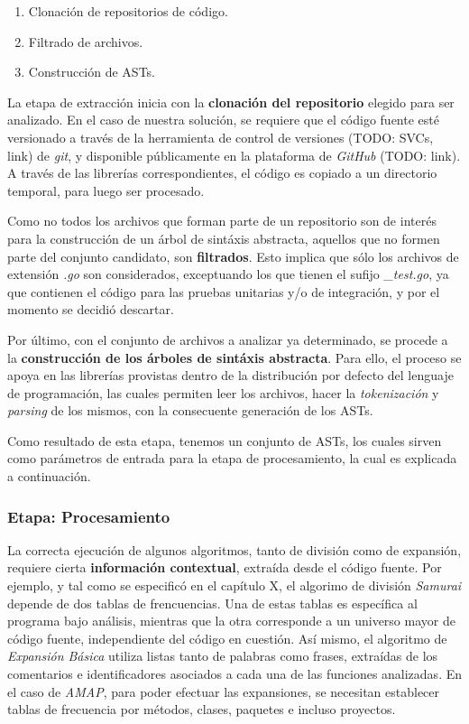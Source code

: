 \begin{enumerate}
  \item Clonación de repositorios de código.
  \item Filtrado de archivos.
  \item Construcción de ASTs.
\end{enumerate}

La etapa de extracción inicia con la \textbf{clonación del repositorio} elegido para ser
analizado. En el caso de nuestra solución, se requiere que el código fuente esté
versionado a través de la herramienta de control de versiones (TODO: SVCs, link) de \textit{git},
y disponible públicamente en la plataforma de \textit{GitHub} (TODO: link).
A través de las librerías correspondientes, el código es copiado a un directorio temporal,
para luego ser procesado.

Como no todos los archivos que forman parte de un repositorio son de interés para la construcción
de un árbol de sintáxis abstracta, aquellos que no formen parte del conjunto candidato, son
\textbf{filtrados}.
Esto implica que sólo los archivos de extensión \textit{.go} son considerados, exceptuando
los que tienen el sufijo \textit{\_test.go}, ya que contienen el código para las pruebas
unitarias y/o de integración, y por el momento se decidió descartar.

Por último, con el conjunto de archivos a analizar ya determinado, se procede a la
\textbf{construcción de los árboles de sintáxis abstracta}.
Para ello, el proceso se apoya en las librerías provistas dentro de la distribución
por defecto del lenguaje de programación, las cuales permiten leer los archivos,
hacer la \textit{tokenización} y \textit{parsing} de los mismos, con la consecuente
generación de los ASTs.


Como resultado de esta etapa, tenemos un conjunto de ASTs, los cuales sirven como parámetros
de entrada para la etapa de procesamiento, la cual es explicada a continuación.

\subsubsection{Etapa: Procesamiento}

La correcta ejecución de algunos algoritmos, tanto de división como de expansión,
requiere cierta \textbf{información contextual}, extraída desde el código fuente.
Por ejemplo, y tal como se especificó en el capítulo X, el algorimo de división \textit{Samurai}
depende de dos tablas de frencuencias.
Una de estas tablas es específica al programa bajo análisis, mientras que la otra corresponde
a un universo mayor de código fuente, independiente del código en cuestión.
Así mismo, el algoritmo de \textit{Expansión Básica} utiliza listas tanto de palabras como frases,
extraídas de los comentarios e identificadores asociados a cada una de las funciones analizadas.
En el caso de \textit{AMAP}, para poder efectuar las expansiones, se necesitan establecer tablas
de frecuencia por métodos, clases, paquetes e incluso proyectos.

